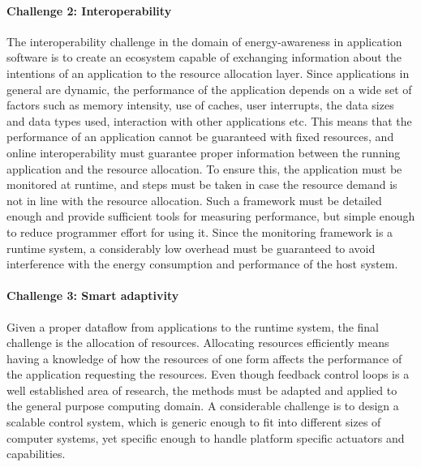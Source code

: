 \documentclass{article}
\begin{document}
\paragraph{Challenge 2: Interoperability}
\label{sec:inter}
The interoperability challenge in the domain of energy-awareness in application software is to create an ecosystem capable of exchanging information about the intentions of an application to the resource allocation layer. 
Since applications in general are dynamic, the performance of the application depends on a wide set of factors such as memory intensity, use of caches, user interrupts, the data sizes and data types used, interaction with other applications etc. 
This means that the performance of an application cannot be guaranteed with fixed resources, and online interoperability must guarantee proper information between the running application and the resource allocation.
To ensure this, the application must be monitored at runtime, and steps must be taken in case the resource demand is not in line with the resource allocation.
Such a framework must be detailed enough and provide sufficient tools for measuring performance, but simple enough to reduce programmer effort for using it.
Since the monitoring framework is a runtime system, a considerably low overhead must be guaranteed to avoid interference with the energy consumption and performance of the host system.

\paragraph{Challenge 3: Smart adaptivity}
\label{sec:smart}
Given a proper dataflow from applications to the runtime system, the final challenge is the allocation of resources. 
Allocating resources efficiently means having a knowledge of how the resources of one form affects the performance of the application requesting the resources.
Even though feedback control loops is a well established area of research, the methods must be adapted and applied to the general purpose computing domain. 
A considerable challenge is to design a scalable control system, which is generic enough to fit into different sizes of computer systems, yet specific enough to handle platform specific actuators and capabilities.
\end{document}
